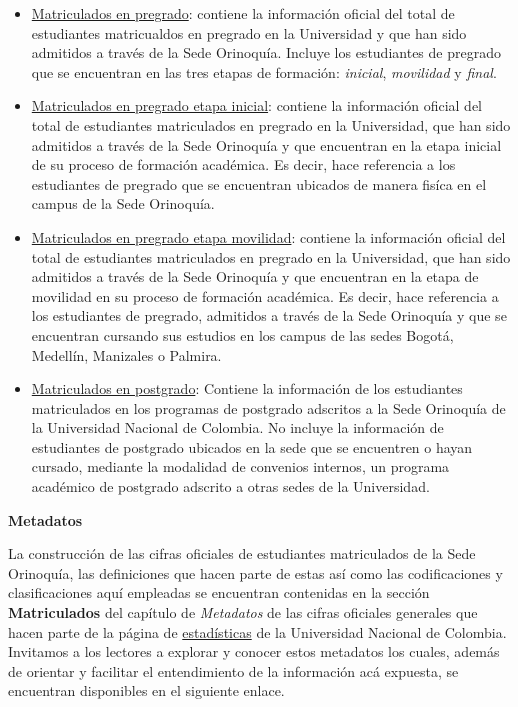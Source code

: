 \documentclass[
]{book}
\begin{document}
\begin{itemize}
\item
  \protect\hyperlink{MatPre}{Matriculados en pregrado}: contiene la información oficial del total de estudiantes matricualdos en pregrado en la Universidad y que han sido admitidos a través de la Sede Orinoquía. Incluye los estudiantes de pregrado que se encuentran en las tres etapas de formación: \emph{inicial}, \emph{movilidad} y \emph{final}.
\item
  \protect\hyperlink{MatPreIni}{Matriculados en pregrado etapa inicial}: contiene la información oficial del total de estudiantes matriculados en pregrado en la Universidad, que han sido admitidos a través de la Sede Orinoquía y que encuentran en la etapa inicial de su proceso de formación académica. Es decir, hace referencia a los estudiantes de pregrado que se encuentran ubicados de manera fisíca en el campus de la Sede Orinoquía.
\item
  \protect\hyperlink{MatPreMov}{Matriculados en pregrado etapa movilidad}: contiene la información oficial del total de estudiantes matriculados en pregrado en la Universidad, que han sido admitidos a través de la Sede Orinoquía y que encuentran en la etapa de movilidad en su proceso de formación académica. Es decir, hace referencia a los estudiantes de pregrado, admitidos a través de la Sede Orinoquía y que se encuentran cursando sus estudios en los campus de las sedes Bogotá, Medellín, Manizales o Palmira.
\item
  \protect\hyperlink{MatPos}{Matriculados en postgrado}: Contiene la información de los estudiantes matriculados en los programas de postgrado adscritos a la Sede Orinoquía de la Universidad Nacional de Colombia. No incluye la información de estudiantes de postgrado ubicados en la sede que se encuentren o hayan cursado, mediante la modalidad de convenios internos, un programa académico de postgrado adscrito a otras sedes de la Universidad.
\end{itemize}

\textbf{Metadatos}

La construcción de las cifras oficiales de estudiantes matriculados de la Sede Orinoquía, las definiciones que hacen parte de estas así como las codificaciones y clasificaciones aquí empleadas se encuentran contenidas en la sección \textbf{Matriculados} del capítulo de \emph{Metadatos} de las cifras oficiales generales que hacen parte de la página de \href{http://estadisticas.unal.edu.co/home/}{estadísticas} de la Universidad Nacional de Colombia. Invitamos a los lectores a explorar y conocer estos metadatos los cuales, además de orientar y facilitar el entendimiento de la información acá expuesta, se encuentran disponibles en el siguiente enlace.
\end{document}
